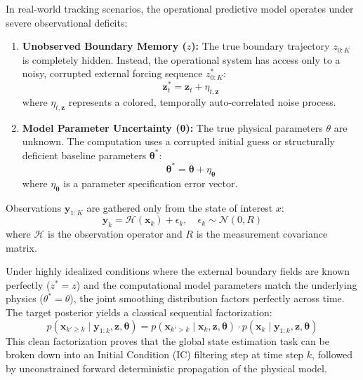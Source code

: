 \documentclass[10pt]{article}
\begin{document}
In real-world tracking scenarios, the operational predictive model operates under severe observational deficits:
\begin{enumerate}
    \item \textbf{Unobserved Boundary Memory ($z$):} The true boundary trajectory $z_{0:K}$ is completely hidden. Instead, the operational system has access only to a noisy, corrupted external forcing sequence $z_{0:K}^*$:
    \begin{equation}
        \mathbf{z}_t^* = \mathbf{z}_t + \eta_{t,\mathbf{z}} \label{eq:noisy_z}
    \end{equation}
    where $\eta_{t,\mathbf{z}}$ represents a colored, temporally auto-correlated noise process.
    \item \textbf{Model Parameter Uncertainty ($\mathbf{\theta}$):} The true physical parameters $\theta$ are unknown. The computation uses a corrupted initial guess or structurally deficient baseline parameters $\mathbf{\theta}^*$:
    \begin{equation}
        \mathbf{\theta}^* =  \mathbf{\theta} + \eta_ \mathbf{\mathbf{\theta}} \label{eq:noisy_theta}
    \end{equation}
    where $\eta_\mathbf{\theta}$ is a parameter specification error vector.
\end{enumerate}
Observations $\mathbf{y}_{1:K}$ are gathered only from the state of interest $x$:
\begin{equation}
    \mathbf{y}_k = \mathcal{H}(\mathbf{x}_k) + \epsilon_k, \quad \epsilon_k \sim \mathcal{N}(0, R) \label{eq:observations}
\end{equation}
where $\mathcal{H}$ is the observation operator and $R$ is the measurement covariance matrix.

Under highly idealized conditions where the external boundary fields are known perfectly ($z^* = z$) and the computational model parameters match the underlying physics ($\theta^* = \theta$), the joint smoothing distribution factors perfectly across time. The target posterior yields a classical sequential factorization:
\begin{equation}
    \label{eq: noise-free factorization}
    p\left (\mathbf{x}_{k' \geq k} \mid \mathbf{y}_{1:k}, \mathbf{z}, \mathbf{\theta}\right) = p\left (\mathbf{x}_{k' > k} \mid \mathbf{x}_{k}, \mathbf{z}, \mathbf{\theta}\right) \cdot p\left (\mathbf{x}_k \mid \mathbf{y}_{1:k}, \mathbf{z}, \mathbf{\theta}\right)
\end{equation}
This clean factorization proves that the global state estimation task can be broken down into an Initial Condition (IC) filtering step at time step $k$, followed by unconstrained forward deterministic propagation of the physical model.
\end{document}
